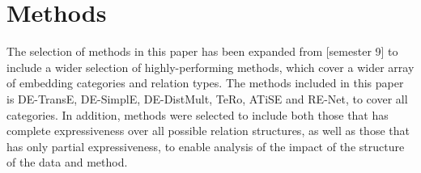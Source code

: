 \section{Methods}
\label{sec:methods}

The selection of methods in this paper has been expanded from [semester 9] to include a wider selection of highly-performing methods, which cover a wider array of embedding categories and relation types. The methods included in this paper is DE-TransE, DE-SimplE, DE-DistMult, TeRo, ATiSE and RE-Net, to cover all categories. In addition, methods were selected to include both those that has complete expressiveness over all possible relation structures, as well as those that has only partial expressiveness, to enable analysis of the impact of the structure of the data and method.

